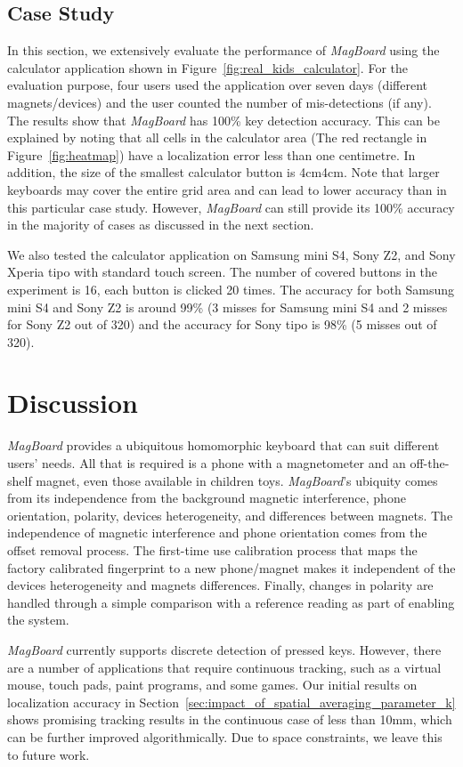 \documentclass[conference]{IEEEtran}
\def \sys {\textit{MagBoard}}
\begin{document}
\subsection{Case Study}
\label{sec:case_study}
In this section, we extensively evaluate the performance of \sys{} using the calculator application shown in Figure~\ref{fig:real_kids_calculator}. For the evaluation purpose, four users used the application over seven days (different magnets/devices) and the user counted the number of mis-detections (if any). 
The results show that \sys{} has 100\% key detection accuracy. This can be explained by noting that all cells in the calculator area (The red rectangle in Figure~\ref{fig:heatmap}) have a localization error less than one centimetre. In addition, the size of the smallest calculator button is 4cm4cm. Note that larger keyboards may cover the entire grid area and can lead to lower accuracy than in this particular case study. However, \sys{} can still provide its 100\% accuracy in the majority of cases as discussed in the next section.

We also tested the calculator application on Samsung mini S4, Sony Z2, and Sony Xperia tipo with standard touch screen. The number of covered buttons in the experiment is 16, each button is clicked 20 times. The accuracy for both Samsung mini S4 and Sony Z2 is around 99\% (3 misses for Samsung mini S4 and 2 misses for Sony Z2 out of 320) and the accuracy for Sony tipo is 98\% (5 misses out of 320).

\section{Discussion}
\label{sec:discussion}
\sys{} provides a ubiquitous homomorphic keyboard that can suit different users' needs. All that is required is a phone with a magnetometer and an off-the-shelf magnet, even those available in children toys. \sys{}'s ubiquity comes from its independence from the background magnetic interference, phone orientation, polarity, devices heterogeneity, and differences between magnets. The independence of magnetic interference and phone orientation comes from the offset removal process. The first-time use calibration process that maps the factory calibrated fingerprint to a new phone/magnet makes it independent of the devices heterogeneity and magnets differences. Finally, changes in polarity are handled through a simple comparison with a reference reading as part of enabling the system.

\sys{} currently supports discrete detection of pressed keys. However, there are a number of applications that require continuous tracking, such as a virtual mouse, touch pads, paint programs, and some games. Our initial results on localization accuracy in Section~\ref{sec:impact_of_spatial_averaging_parameter_k} shows promising tracking results in the continuous case of less than 10mm, which can be further improved algorithmically. Due to space constraints, we leave this to future work.
\end{document}
